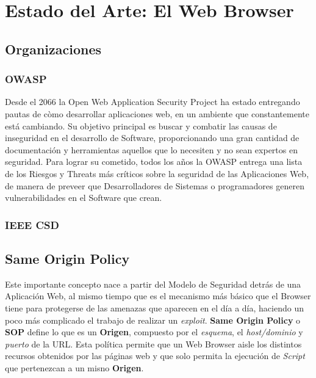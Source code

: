 \chapter{Estado del Arte: El Web Browser}
\label{chap:chap2}


\section{Organizaciones}
\label{chap:Orgs}

\subsection{OWASP}
Desde el 2066 la Open Web Application Security Project ha estado entregando pautas de còmo desarrollar aplicaciones web, en un ambiente que constantemente está cambiando. Su objetivo principal es buscar y combatir las causas de inseguridad en el desarrollo de Software, proporcionando una gran cantidad de documentación y herramientas aquellos que lo necesiten y no sean expertos en seguridad. Para lograr su cometido, todos los años la OWASP entrega una lista de los Riesgos y Threats más críticos sobre la seguridad de las Aplicaciones Web, de manera de preveer que Desarrolladores de Sistemas o programadores generen vulnerabilidades en el Software que crean.


\subsection{IEEE CSD}



\section{Same Origin Policy}
\label{chap:SOP}

Este importante concepto nace a partir del Modelo de Seguridad detrás de una Aplicación Web, al mismo tiempo que es el mecanismo más básico que el Browser tiene para protegerse de las amenazas que aparecen en el día a día, haciendo un poco más complicado el trabajo de realizar un \textit{exploit}. \textbf{Same Origin Policy} o \textbf{SOP} define lo que es un \textbf{Origen}, compuesto por el \textit{esquema}, el \textit{host/dominio} y \textit{puerto} de la URL. Esta política permite que un Web Browser aisle los distintos recursos obtenidos por las páginas web y que solo permita la ejecución de \textit{Script} que pertenezcan a un misno \textbf{Origen}. 

